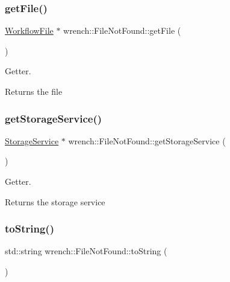 \subsubsection{\texorpdfstring{get\+File()}{getFile()}}
{\footnotesize\ttfamily \hyperlink{classwrench_1_1_workflow_file}{Workflow\+File} $\ast$ wrench\+::\+File\+Not\+Found\+::get\+File (\begin{DoxyParamCaption}{ }\end{DoxyParamCaption})}



Getter. 

\begin{DoxyReturn}{Returns}
the file 
\end{DoxyReturn}
\mbox{\label{classwrench_1_1_file_not_found_ac831b3a371f81e56bfac869fd4113514}} 
\subsubsection{\texorpdfstring{get\+Storage\+Service()}{getStorageService()}}
{\footnotesize\ttfamily \hyperlink{classwrench_1_1_storage_service}{Storage\+Service} $\ast$ wrench\+::\+File\+Not\+Found\+::get\+Storage\+Service (\begin{DoxyParamCaption}{ }\end{DoxyParamCaption})}



Getter. 

\begin{DoxyReturn}{Returns}
the storage service 
\end{DoxyReturn}
\mbox{\label{classwrench_1_1_file_not_found_ac9c3bdcc58b4626a0f3de0b4288bf4b4}} 
\subsubsection{\texorpdfstring{to\+String()}{toString()}}
{\footnotesize\ttfamily std\+::string wrench\+::\+File\+Not\+Found\+::to\+String (\begin{DoxyParamCaption}{ }\end{DoxyParamCaption})\hspace{0.3cm}{\ttfamily [virtual]}}



